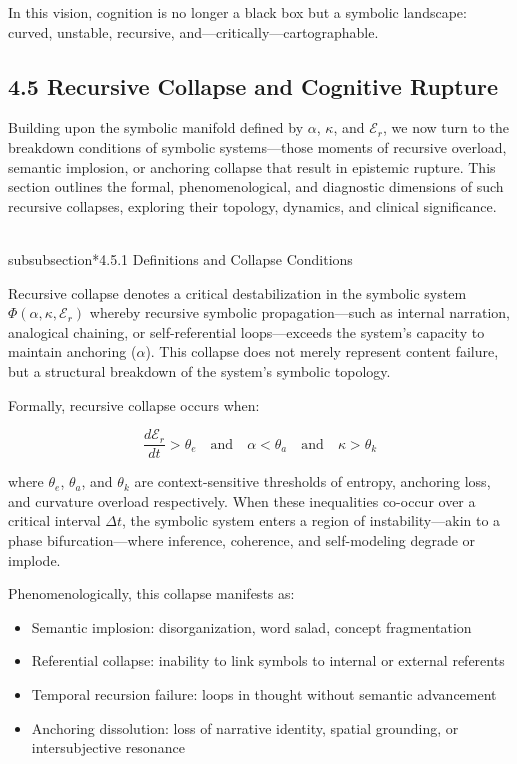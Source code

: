 In this vision, cognition is no longer a black box but a symbolic landscape: curved, unstable, recursive, and—critically—cartographable.


\subsection*{4.5 Recursive Collapse and Cognitive Rupture}

Building upon the symbolic manifold defined by $\alpha$, $\kappa$, and $\mathcal{E}_r$, we now turn to the breakdown conditions of symbolic systems—those moments of recursive overload, semantic implosion, or anchoring collapse that result in epistemic rupture. This section outlines the formal, phenomenological, and diagnostic dimensions of such recursive collapses, exploring their topology, dynamics, and clinical significance.

\\subsubsection*{4.5.1 Definitions and Collapse Conditions}

Recursive collapse denotes a critical destabilization in the symbolic system $\Phi(\alpha, \kappa, \mathcal{E}_r)$ whereby recursive symbolic propagation—such as internal narration, analogical chaining, or self-referential loops—exceeds the system's capacity to maintain anchoring ($\alpha$). This collapse does not merely represent content failure, but a structural breakdown of the system’s symbolic topology.

Formally, recursive collapse occurs when:

\[
\frac{d\mathcal{E}_r}{dt} > \theta_e \quad \text{and} \quad \alpha < \theta_a \quad \text{and} \quad \kappa > \theta_k
\]

where $\theta_e$, $\theta_a$, and $\theta_k$ are context-sensitive thresholds of entropy, anchoring loss, and curvature overload respectively. When these inequalities co-occur over a critical interval $\Delta t$, the symbolic system enters a region of instability—akin to a phase bifurcation—where inference, coherence, and self-modeling degrade or implode.

Phenomenologically, this collapse manifests as:

\begin{itemize}
  \item Semantic implosion: disorganization, word salad, concept fragmentation
  \item Referential collapse: inability to link symbols to internal or external referents
  \item Temporal recursion failure: loops in thought without semantic advancement
  \item Anchoring dissolution: loss of narrative identity, spatial grounding, or intersubjective resonance
\end{itemize}

